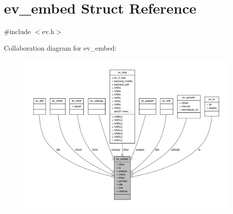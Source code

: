\hypertarget{structev__embed}{\section{ev\-\_\-embed \-Struct \-Reference}
\label{structev__embed}
}


{\ttfamily \#include $<$ev.\-h$>$}



\-Collaboration diagram for ev\-\_\-embed\-:
\nopagebreak
\begin{figure}[H]
\begin{center}
\leavevmode
\includegraphics[width=350pt]{structev__embed__coll__graph}
\end{center}
\end{figure}

